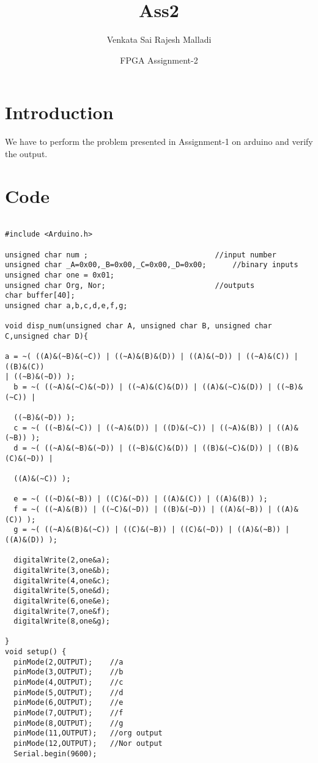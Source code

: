 \documentclass{article}
\title{Ass2}
\author{Venkata Sai Rajesh Malladi}
\date{FPGA Assignment-2}
\begin{document}
\maketitle

\section{Introduction}

We have to perform the problem presented in Assignment-1 on arduino and verify the output.

\section{Code}

\begin{verbatim}

#include <Arduino.h>

unsigned char num ;                             //input number
unsigned char _A=0x00,_B=0x00,_C=0x00,_D=0x00;      //binary inputs
unsigned char one = 0x01;
unsigned char Org, Nor;                         //outputs
char buffer[40];
unsigned char a,b,c,d,e,f,g;

void disp_num(unsigned char A, unsigned char B, unsigned char C,unsigned char D){

a = ~( ((A)&(~B)&(~C)) | ((~A)&(B)&(D)) | ((A)&(~D)) | ((~A)&(C)) | ((B)&(C)) 
| ((~B)&(~D)) );
  b = ~( ((~A)&(~C)&(~D)) | ((~A)&(C)&(D)) | ((A)&(~C)&(D)) | ((~B)&(~C)) | 
  
  ((~B)&(~D)) );
  c = ~( ((~B)&(~C)) | ((~A)&(D)) | ((D)&(~C)) | ((~A)&(B)) | ((A)&(~B)) );
  d = ~( ((~A)&(~B)&(~D)) | ((~B)&(C)&(D)) | ((B)&(~C)&(D)) | ((B)&(C)&(~D)) | 
  
  ((A)&(~C)) );
  
  e = ~( ((~D)&(~B)) | ((C)&(~D)) | ((A)&(C)) | ((A)&(B)) );
  f = ~( ((~A)&(B)) | ((~C)&(~D)) | ((B)&(~D)) | ((A)&(~B)) | ((A)&(C)) );
  g = ~( ((~A)&(B)&(~C)) | ((C)&(~B)) | ((C)&(~D)) | ((A)&(~B)) | ((A)&(D)) );

  digitalWrite(2,one&a);
  digitalWrite(3,one&b);
  digitalWrite(4,one&c);
  digitalWrite(5,one&d);
  digitalWrite(6,one&e);
  digitalWrite(7,one&f);
  digitalWrite(8,one&g);

}
void setup() {
  pinMode(2,OUTPUT);    //a
  pinMode(3,OUTPUT);    //b
  pinMode(4,OUTPUT);    //c
  pinMode(5,OUTPUT);    //d
  pinMode(6,OUTPUT);    //e
  pinMode(7,OUTPUT);    //f
  pinMode(8,OUTPUT);    //g
  pinMode(11,OUTPUT);   //org output
  pinMode(12,OUTPUT);   //Nor output
  Serial.begin(9600);


\end{verbatim}
\end{document}
